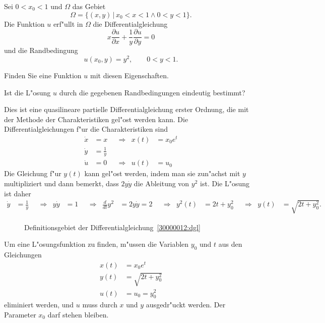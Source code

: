 Sei $0 < x_0 < 1$ und $\Omega$ das Gebiet
\[
\Omega=\{ (x,y)\,|\, x_0<x<1\wedge 0 < y < 1\}.
\]
Die Funktion $u$ erf"ullt in $\Omega$ die Differentialgleichung
\begin{equation}
x\frac{\partial u}{\partial x}
+
\frac1y\frac{\partial u}{\partial y}
=
0
\label{30000012:dgl}
\end{equation}
und die Randbedingung 
\[
u(x_0,y)=y^2,\qquad 0<y<1.
\]
\begin{teilaufgaben}
\item
Finden Sie eine Funktion $u$ mit diesen Eigenschaften.
\item
Ist die L"osung $u$ durch die gegebenen Randbedingungen eindeutig bestimmt?
\end{teilaufgaben}

\begin{loesung}
Dies ist eine quasilineare partielle Differentialgleichung erster Ordnung,
die mit der Methode der Charakteristiken gel"ost werden kann.
Die Differentialgleichungen f"ur die Charakteristiken sind
\[
\begin{aligned}
\dot x &= x       &&\Rightarrow&   x(t) &= x_0 e^t \\
\dot y &= \frac1y &&           &        &          \\
\dot u &= 0       &&\Rightarrow&   u(t) &= u_0
\end{aligned}
\]
Die Gleichung f"ur $y(t)$ kann gel"ost werden, indem man sie zun"achst mit
$y$ multipliziert und dann bemerkt, dass $2y\dot y$ die Ableitung von $y^2$
ist.
Die L"osung ist daher
\begin{align*}
\dot y &= \frac1y
&&\Rightarrow&
y\dot y &= 1
&&\Rightarrow&
\frac{d}{dt}y^2&=2y\dot y=2
&&\Rightarrow&
y^2(t) &= 2t + y_0^2
&&\Rightarrow&
y(t)&=\sqrt{2t+y_0^2}.
\end{align*}
\begin{figure}
\centering
{}
\caption{Definitionsgebiet der Differentialgleichung~\ref{30000012:dgl}
\label{30000012:domain}}
\end{figure}
\begin{teilaufgaben}
\item
Um eine L"osungsfunktion zu finden, m"ussen die Variablen $y_0$ und $t$ aus den
Gleichungen
\begin{align*}
x(t) &= x_0e^t\\
y(t)&=\sqrt{2t+y_0^2}\\
u(t)&=u_0 = y_0^2
\end{align*}
eliminiert werden, und $u$ muss durch $x$ und $y$ ausgedr"uckt werden.
Der Parameter $x_0$ darf stehen bleiben.


\end{teilaufgaben}
\end{loesung}
